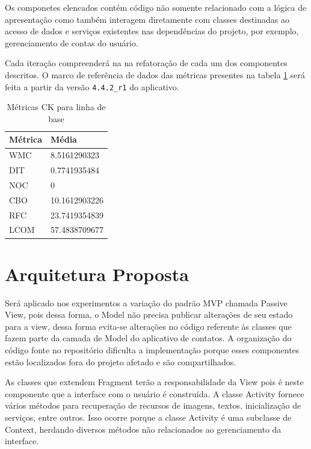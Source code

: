 Os componetes elencados contém código não somente relacionado com a lógica de
apresentação como também interagem diretamente com classes destinadas ao acesso
de dados e serviços existentes nas dependências do projeto, por exemplo,
gerenciamento de contas do usuário. 

Cada iteração compreenderá na na refatoração de cada um dos componentes
descritos. O marco de referência de dados das métricas presentes na tabela \ref{tab:dados_baseline} será feita a partir da
versão \verb|4.4.2_r1| do aplicativo.

\begin{table}[h]
	\centering
    \begin{tabular}{ | l | l | }
    \hline
    Métrica &	Média \\ \hline
    WMC  	&	8.5161290323   	\\ \hline
    DIT	 	&	0.7741935484	\\ \hline
	NOC  	& 	0				\\ \hline
	CBO	  	& 	10.1612903226	\\ \hline
	RFC	 	& 	23.7419354839	\\ \hline
	LCOM 	& 	57.4838709677	\\ \hline
    \end{tabular}
    \caption{Métricas CK para linha de base}
    \label{tab:dados_baseline}
\end{table}

\section{Arquitetura Proposta}

Será aplicado nos experimentos a variação do padrão MVP chamada Passive View,
pois dessa forma, o Model não precisa publicar alterações de seu estado para a
view, dessa forma evita-se alterações no código referente às classes que fazem
parte da camada de Model do aplicativo de contatos. A organização do código
fonte no repositório dificulta a implementação porque esses componentes estão
localizados fora do projeto afetado e são compartilhados.

As classes que extendem Fragment terão a responsabilidade da View pois é neste
componente que a interface com o usuário é construída. A classe Activity fornece
vários métodos para recuperação de recursos de imagens, textos, inicialização de
serviços, entre outros. Isso ocorre porque a classe Activity é uma subclasse de Context, herdando diversos métodos não relacionados ao gerenciamento da interface.

